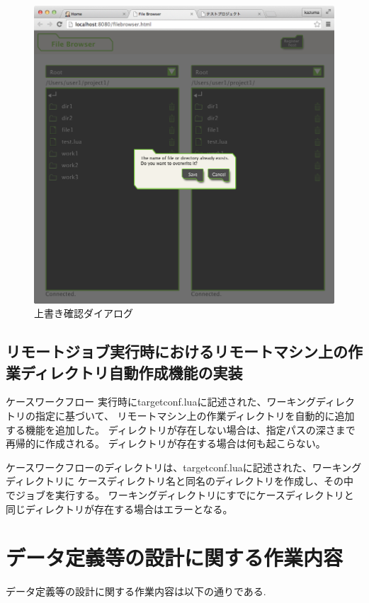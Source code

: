 \documentclass[a4paper,10pt,oneside]{jsbook}
\begin{document}
\begin{figure}[htbp]
	\begin{center}
		\includegraphics[width=12.0cm]{image/confirm_dialog.png}
	\end{center}
	\caption{上書き確認ダイアログ}
	\label{fig:confirm_dialog}
\end{figure}


\section{リモートジョブ実行時におけるリモートマシン上の作業ディレクトリ自動作成機能の実装}
ケースワークフロー	実行時にtargetconf.luaに記述された、ワーキングディレクトリの指定に基づいて、
リモートマシン上の作業ディレクトリを自動的に追加する機能を追加した。
ディレクトリが存在しない場合は、指定パスの深さまで再帰的に作成される。
ディレクトリが存在する場合は何も起こらない。

ケースワークフローのディレクトリは、targetconf.luaに記述された、ワーキングディレクトリに
ケースディレクトリ名と同名のディレクトリを作成し、その中でジョブを実行する。
ワーキングディレクトリにすでにケースディレクトリと同じディレクトリが存在する場合はエラーとなる。


\chapter{データ定義等の設計に関する作業内容}
データ定義等の設計に関する作業内容は以下の通りである.
\end{document}
